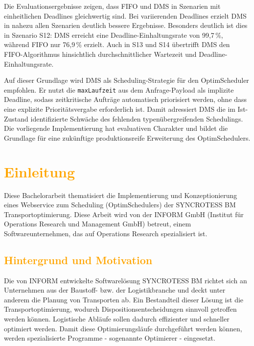 \documentclass[
    12pt,               
    a4paper,            
    ngerman,            
    parskip=half,       
    headings=normal,   
    numbers=enddot,     
    toc=chapterentrywithdots 
]{scrreprt}\usepackage[utf8]{inputenc}
\begin{document}
Die Evaluationsergebnisse zeigen, dass FIFO und DMS in Szenarien mit einheitlichen Deadlines gleichwertig sind. Bei variierenden Deadlines erzielt DMS in nahezu allen Szenarien deutlich bessere Ergebnisse. Besonders deutlich ist dies in Szenario S12: DMS erreicht eine Deadline-Einhaltungsrate von 99,7\,\%, während FIFO nur 76,9\,\% erzielt. Auch in S13 und S14 übertrifft DMS den FIFO-Algorithmus hinsichtlich durchschnittlicher Wartezeit und Deadline-Einhaltungsrate.

Auf dieser Grundlage wird DMS als Scheduling-Strategie für den OptimScheduler empfohlen. Er nutzt die \texttt{maxLaufzeit} aus dem Anfrage-Payload als implizite Deadline, sodass zeitkritische Aufträge automatisch priorisiert werden, ohne dass eine explizite Prioritätsvergabe erforderlich ist. Damit adressiert DMS die im Ist-Zustand identifizierte Schwäche des fehlenden typenübergreifenden Schedulings. Die vorliegende Implementierung hat evaluativen Charakter und bildet die Grundlage für eine zukünftige produktionsreife Erweiterung des OptimSchedulers.
\newpage

\tableofcontents

\chapter{\textcolor{orange}{Einleitung}}

Diese Bachelorarbeit thematisiert die Implementierung und Konzeptionierung eines Webservice zum Scheduling (OptimSchedulers) der SYNCROTESS BM Transportoptimierung. Diese Arbeit wird von der INFORM GmbH (Institut für Operations Research und Management GmbH) betreut, einem Softwareunternehmen, das auf Operations Research spezialisiert ist.

\section{\textcolor{orange}{Hintergrund und Motivation}}

Die von INFORM entwickelte Softwarelösung SYNCROTESS BM richtet sich an Unternehmen aus der Baustoff- bzw. der Logistikbranche und deckt unter anderem die Planung von Transporten ab. Ein Bestandteil dieser Lösung ist die Transportoptimierung, wodurch Dispositionsentscheidungen sinnvoll getroffen werden können. Logistische Abläufe sollen dadurch effizienter und schneller optimiert werden. Damit diese Optimierungsläufe durchgeführt werden können, werden spezialisierte Programme - sogenannte Optimierer - eingesetzt.
\end{document}
